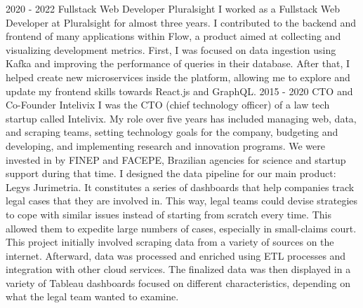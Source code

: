 
\cvevent
    {2020 - 2022}
    {Fullstack Web Developer}
    {Pluralsight}
    {I worked as a Fullstack Web Developer at Pluralsight for almost three years. I contributed to the backend and frontend of many applications within Flow, a product aimed at collecting and visualizing development metrics. First, I was focused on data ingestion using Kafka and improving the performance of queries in their database. After that, I helped create new microservices inside the platform, allowing me to explore and update my frontend skills towards React.js and GraphQL.}
    {}
    {}
    {}
\cvevent
    {2015 - 2020}
    {CTO and Co-Founder}
    {Intelivix}
    {I was the CTO (chief technology officer) of a law tech startup called Intelivix. My role over five years has included managing web, data, and scraping teams, setting technology goals for the company, budgeting and developing, and implementing research and innovation programs. We were invested in by FINEP and FACEPE, Brazilian agencies for science and startup support during that time. I designed the data pipeline for our main product: Legys Jurimetria. It constitutes a series of dashboards that help companies track legal cases that they are involved in. This way, legal teams could devise strategies to cope with similar issues instead of starting from scratch every time. This allowed them to expedite large numbers of cases, especially in small-claims court. This project initially involved scraping data from a variety of sources on the internet. Afterward, data was processed and enriched using ETL processes and integration with other cloud services. The finalized data was then displayed in a variety of Tableau dashboards focused on different characteristics, depending on what the legal team wanted to examine.}
    {}
    {}
